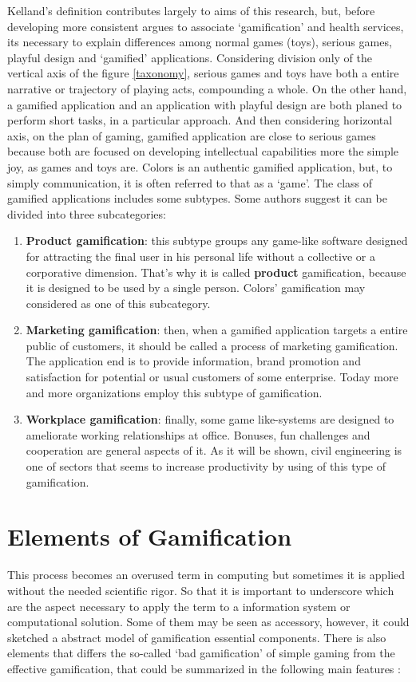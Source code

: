 Kelland's definition contributes largely to aims of this research, but, before developing more consistent argues to associate `gamification' and health services, its necessary to explain differences among normal games (toys), serious games, playful design and `gamified' applications. Considering division only of the vertical axis of the figure \ref{taxonomy}, serious games and toys have both a entire narrative or trajectory of playing acts, compounding a whole. On the other hand, a gamified application and an application with playful design are both planed to perform short tasks, in a particular approach. And then considering horizontal axis, on the plan of gaming, gamified application are close to serious games because both are focused on developing intellectual capabilities more the simple joy, as games and toys are.  Colors is an authentic gamified application, but, to simply communication, it is often referred to that as a `game'. The class of gamified applications includes some subtypes. Some authors suggest it can be divided into three subcategories:

\begin{enumerate}
	\item \textbf{Product gamification}: this subtype groups any game-like software designed for attracting the final user in his personal life without a collective or a corporative dimension. That's why it is called \textbf{product} gamification, because it is designed to be used by a single person. Colors' gamification may considered as one of this subcategory.
	\item \textbf{Marketing gamification}: then, when a gamified application targets a entire public of customers, it should be called a process of marketing gamification. The application end is to provide information, brand promotion and satisfaction for potential or usual customers of some enterprise. Today more and more organizations employ this subtype of gamification.
	\item \textbf{Workplace gamification}: finally, some game like-systems are designed to ameliorate working relationships at office. Bonuses, fun challenges and cooperation are general aspects of it. As it will be shown, civil engineering is one of sectors that seems to increase productivity by using of this type of gamification. 
\end{enumerate}

\section{Elements of Gamification}
This process becomes an overused term in computing but sometimes it is applied without the needed scientific rigor. So that it is important to underscore which are the aspect necessary to apply the term to a information system or computational solution. Some of them may be seen as accessory, however, it could sketched a abstract model of gamification essential components. There is also elements that differs the so-called `bad gamification' of simple gaming from the effective gamification, that could be summarized in the following main features \citep{conf/mue/Yamakami13a}:

